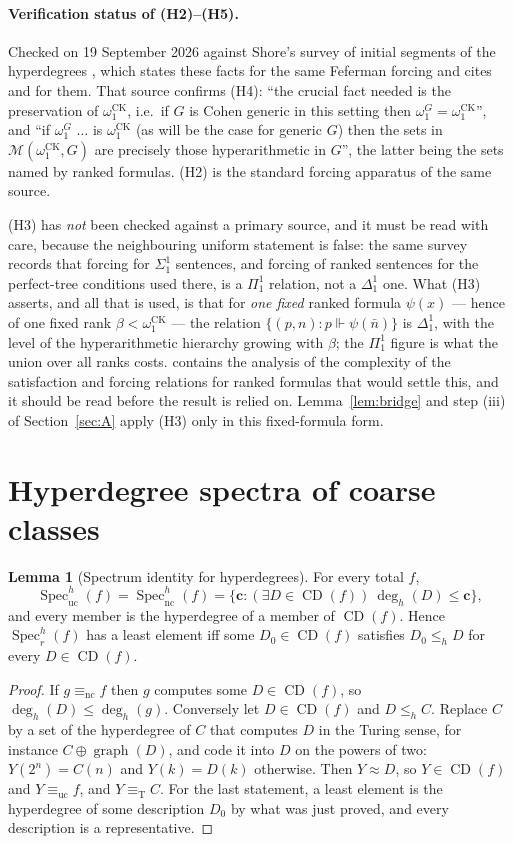 \documentclass[11pt,letterpaper]{article}
\theoremstyle{definition}
\newtheorem{lemma}[definition]{Lemma}
\numberwithin{equation}{section}
\newcommand{\eqT}{\equiv_{\mathrm T}}
\newcommand{\eqnc}{\equiv_{\mathrm{nc}}}
\newcommand{\equc}{\equiv_{\mathrm{uc}}}
\newcommand{\nc}{\mathrm{nc}}
\newcommand{\uc}{\mathrm{uc}}
\newcommand{\CD}{\operatorname{CD}}
\newcommand{\leh}{\le_{h}}
\newcommand{\Dh}{\Delta^1_1}
\newcommand{\Spech}{\operatorname{Spec}^h}
\newcommand{\degh}{\deg_h}
\newcommand{\omck}{\omega_1^{\mathrm{CK}}}
\newcommand{\forces}{\Vdash}
\begin{document}
\paragraph{Verification status of (H2)--(H5).} Checked on 19 September 2026 against Shore's survey of initial segments of the hyperdegrees \cite{ShoreLattice}, which states these facts for the same Feferman forcing and cites \cite{Feferman} and \cite[III.4, IV.4]{SacksHRT} for them. That source confirms (H4): ``the crucial fact needed is the preservation of $\omck$, i.e.\ if $G$ is Cohen generic in this setting then $\omega_1^G=\omck$'', and ``if $\omega_1^G$ $\ldots$ is $\omck$ (as will be the case for generic $G$) then the sets in $\mathcal M(\omck,G)$ are precisely those hyperarithmetic in $G$'', the latter being the sets named by ranked formulas. (H2) is the standard forcing apparatus of the same source.

(H3) has \emph{not} been checked against a primary source, and it must be read with care, because the neighbouring uniform statement is false: the same survey records that forcing for $\Sigma^1_1$ sentences, and forcing of ranked sentences for the perfect-tree conditions used there, is a $\Pi^1_1$ relation, not a $\Dh$ one. What (H3) asserts, and all that is used, is that for \emph{one fixed} ranked formula $\psi(x)$ --- hence of one fixed rank $\beta<\omck$ --- the relation $\{(p,n):p\forces\psi(\bar n)\}$ is $\Dh$, with the level of the hyperarithmetic hierarchy growing with $\beta$; the $\Pi^1_1$ figure is what the union over all ranks costs. \cite[III.4]{SacksHRT} contains the analysis of the complexity of the satisfaction and forcing relations for ranked formulas that would settle this, and it should be read before the result is relied on. Lemma~\ref{lem:bridge} and step (iii) of Section~\ref{sec:A} apply (H3) only in this fixed-formula form.

\section{Hyperdegree spectra of coarse classes}\label{sec:spectra}
\begin{lemma}[Spectrum identity for hyperdegrees]\label{lem:hspec}
For every total $f$,
\[
 \Spech_{\uc}(f)=\Spech_{\nc}(f)=\{\mathbf c:(\exists D\in\CD(f))\ \degh(D)\le\mathbf c\},
\]
and every member is the hyperdegree of a member of $\CD(f)$. Hence $\Spech_r(f)$ has a least element iff some $D_0\in\CD(f)$ satisfies $D_0\leh D$ for every $D\in\CD(f)$.
\end{lemma}
\begin{proof}
If $g\eqnc f$ then $g$ computes some $D\in\CD(f)$, so $\degh(D)\le\degh(g)$. Conversely let $D\in\CD(f)$ and $D\leh C$. Replace $C$ by a set of the hyperdegree of $C$ that computes $D$ in the Turing sense, for instance $C\oplus\operatorname{graph}(D)$, and code it into $D$ on the powers of two: $Y(2^n)=C(n)$ and $Y(k)=D(k)$ otherwise. Then $Y\approx D$, so $Y\in\CD(f)$ and $Y\equc f$, and $Y\eqT C$. For the last statement, a least element is the hyperdegree of some description $D_0$ by what was just proved, and every description is a representative.
\end{proof}
\end{document}
